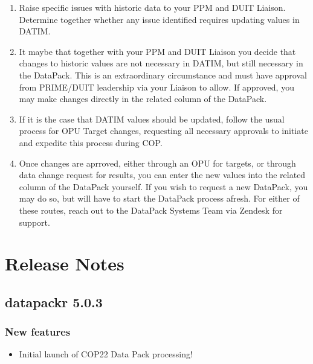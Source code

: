 \documentclass[
  openany]{book}
\providecommand{\tightlist}{%
  \setlength{\itemsep}{0pt}\setlength{\parskip}{0pt}}
\begin{document}
\begin{enumerate}
\def\labelenumi{\arabic{enumi}.}
\item
  Raise specific issues with historic data to your PPM and DUIT
  Liaison. Determine together whether any issue identified requires
  updating values in DATIM.
\item
  It maybe that together with your PPM and DUIT Liaison you decide
  that changes to historic values are not necessary in DATIM, but
  still necessary in the DataPack. This is an extraordinary
  circumstance and must have approval from PRIME/DUIT leadership via
  your Liaison to allow. If approved, you may make changes directly in
  the related column of the DataPack.
\item
  If it is the case that DATIM values should be updated, follow the
  usual process for OPU Target changes, requesting all necessary
  approvals to initiate and expedite this process during COP.
\item
  Once changes are aprroved, either through an OPU for targets, or
  through data change request for results, you can enter the new
  values into the related column of the DataPack yourself. If you wish
  to request a new DataPack, you may do so, but will have to start the
  DataPack process afresh. For either of these routes, reach out to
  the DataPack Systems Team via Zendesk for support.
\end{enumerate}

\newpage

\hypertarget{release-notes}{%
\chapter{Release Notes}\label{release-notes}}

\hypertarget{datapackr-5.0.3}{%
\section{datapackr 5.0.3}\label{datapackr-5.0.3}}

\hypertarget{new-features}{%
\subsection{New features}\label{new-features}}

\begin{itemize}
\tightlist
\item
  Initial launch of COP22 Data Pack processing!
\end{itemize}
\end{document}
